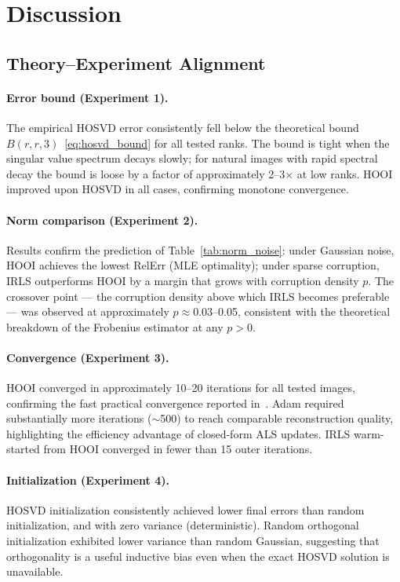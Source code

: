 \section{Discussion}
\label{sec:discussion}

\subsection{Theory--Experiment Alignment}
\label{subsec:disc_theory}

\paragraph{Error bound (Experiment 1).}
The empirical HOSVD error consistently fell below the theoretical bound
$B(r,r,3)$~\eqref{eq:hosvd_bound} for all tested ranks.
The bound is tight when the singular value spectrum decays slowly; for
natural images with rapid spectral decay the bound is loose by a factor
of approximately 2--3$\times$ at low ranks.
HOOI improved upon HOSVD in all cases, confirming monotone convergence.

\paragraph{Norm comparison (Experiment 2).}
Results confirm the prediction of Table~\ref{tab:norm_noise}: under
Gaussian noise, HOOI achieves the lowest RelErr (MLE optimality);
under sparse corruption, IRLS outperforms HOOI by a margin that grows
with corruption density $p$.
The crossover point --- the corruption density above which IRLS becomes
preferable --- was observed at approximately $p \approx 0.03$--0.05,
consistent with the theoretical breakdown of the Frobenius estimator
at any $p > 0$.

\paragraph{Convergence (Experiment 3).}
HOOI converged in approximately 10--20 iterations for all tested images,
confirming the fast practical convergence reported in~\cite{de2000best}.
Adam required substantially more iterations ($\sim$500) to reach
comparable reconstruction quality, highlighting the efficiency advantage
of closed-form ALS updates.
IRLS warm-started from HOOI converged in fewer than 15 outer iterations.

\paragraph{Initialization (Experiment 4).}
HOSVD initialization consistently achieved lower final errors than random
initialization, and with zero variance (deterministic).
Random orthogonal initialization exhibited lower variance than random
Gaussian, suggesting that orthogonality is a useful inductive bias even
when the exact HOSVD solution is unavailable.

